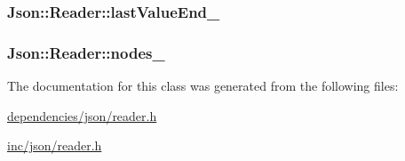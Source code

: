 \hypertarget{classJson_1_1Reader_a497a114f7b760f1b794b8fff9876615a}{
\subsubsection[{last\-Value\-End\-\_\-}]{ Json\-::\-Reader\-::last\-Value\-End\-\_\-\hspace{0.3cm}{\ttfamily [private]}}}\label{d1/d62/classJson_1_1Reader_a497a114f7b760f1b794b8fff9876615a}
\hypertarget{classJson_1_1Reader_ada3d2c47699dad662e6d156c8c78a6ac}{
\subsubsection[{nodes\-\_\-}]{ Json\-::\-Reader\-::nodes\-\_\-\hspace{0.3cm}{\ttfamily [private]}}}\label{d1/d62/classJson_1_1Reader_ada3d2c47699dad662e6d156c8c78a6ac}


The documentation for this class was generated from the following files\-:\begin{DoxyCompactItemize}
\item 
\hyperlink{dependencies_2json_2reader_8h}{dependencies/json/reader.\-h}\item 
\hyperlink{inc_2json_2reader_8h}{inc/json/reader.\-h}\end{DoxyCompactItemize}
